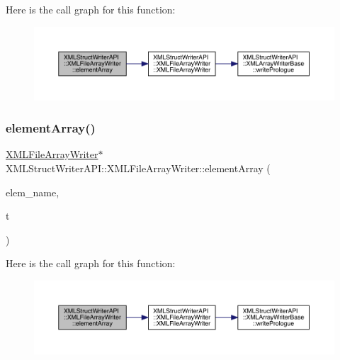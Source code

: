 Here is the call graph for this function\+:
\nopagebreak
\begin{figure}[H]
\begin{center}
\leavevmode
\includegraphics[width=350pt]{d1/d9d/classXMLStructWriterAPI_1_1XMLFileArrayWriter_ad455da07ae5725cffdab8b056681ec2d_cgraph}
\end{center}
\end{figure}
\mbox{\label{classXMLStructWriterAPI_1_1XMLFileArrayWriter_ad455da07ae5725cffdab8b056681ec2d}} 
\subsubsection{\texorpdfstring{elementArray()}{elementArray()}\hspace{0.1cm}{\footnotesize\ttfamily [4/4]}}
{\footnotesize\ttfamily \mbox{\hyperlink{classXMLStructWriterAPI_1_1XMLFileArrayWriter}{X\+M\+L\+File\+Array\+Writer}}$\ast$ X\+M\+L\+Struct\+Writer\+A\+P\+I\+::\+X\+M\+L\+File\+Array\+Writer\+::element\+Array (\begin{DoxyParamCaption}\item[{const std\+::string \&}]{elem\+\_\+name,  }\item[{\mbox{\hyperlink{namespaceXMLStructWriterAPI_a2017208be87c77a32bdc19ea2f14d032}{Array\+Type}}}]{t }\end{DoxyParamCaption})\hspace{0.3cm}{\ttfamily [inline]}}

Here is the call graph for this function\+:
\nopagebreak
\begin{figure}[H]
\begin{center}
\leavevmode
\includegraphics[width=350pt]{d1/d9d/classXMLStructWriterAPI_1_1XMLFileArrayWriter_ad455da07ae5725cffdab8b056681ec2d_cgraph}
\end{center}
\end{figure}
\mbox{\label{classXMLStructWriterAPI_1_1XMLFileArrayWriter_aca9a5098cc4549e2001fc148ccb6329e}} 
